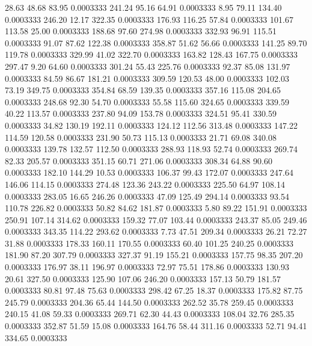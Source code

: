   28.63   48.68   83.95   0.0003333
 241.24   95.16   64.91   0.0003333
   8.95   79.11  134.40   0.0003333
 246.20   12.17  322.35   0.0003333
 176.93  116.25   57.84   0.0003333
 101.67  113.58   25.00   0.0003333
 188.68   97.60  274.98   0.0003333
 332.93   96.91  115.51   0.0003333
  91.07   87.62  122.38   0.0003333
 358.87   51.62   56.66   0.0003333
 141.25   89.70  119.78   0.0003333
 329.99   41.02  322.70   0.0003333
 163.82  128.43  167.75   0.0003333
 297.47    9.20   64.60   0.0003333
 301.24   55.43  225.76   0.0003333
  92.37   85.08  131.97   0.0003333
  84.59   86.67  181.21   0.0003333
 309.59  120.53   48.00   0.0003333
 102.03   73.19  349.75   0.0003333
 354.84   68.59  139.35   0.0003333
 357.16  115.08  204.65   0.0003333
 248.68   92.30   54.70   0.0003333
  55.58  115.60  324.65   0.0003333
 339.59   40.22  113.57   0.0003333
 237.80   94.09  153.78   0.0003333
 324.51   95.41  330.59   0.0003333
  34.82  130.19  192.11   0.0003333
 124.12  112.56  313.48   0.0003333
 147.22  114.59  120.58   0.0003333
 231.90   50.73  115.13   0.0003333
  21.71   69.08  340.08   0.0003333
 139.78  132.57  112.50   0.0003333
 288.93  118.93   52.74   0.0003333
 269.74   82.33  205.57   0.0003333
 351.15   60.71  271.06   0.0003333
 308.34   64.88   90.60   0.0003333
 182.10  144.29   10.53   0.0003333
 106.37   99.43  172.07   0.0003333
 247.64  146.06  114.15   0.0003333
 274.48  123.36  243.22   0.0003333
 225.50   64.97  108.14   0.0003333
 283.05   16.65  246.26   0.0003333
  47.09  125.49  294.14   0.0003333
  93.54  110.78  226.82   0.0003333
  50.82   84.62  181.87   0.0003333
   5.80   89.22  151.91   0.0003333
 250.91  107.14  314.62   0.0003333
 159.32   77.07  103.44   0.0003333
 243.37   85.05  249.46   0.0003333
 343.35  114.22  293.62   0.0003333
   7.73   47.51  209.34   0.0003333
  26.21   72.27   31.88   0.0003333
 178.33  160.11  170.55   0.0003333
  60.40  101.25  240.25   0.0003333
 181.90   87.20  307.79   0.0003333
 327.37   91.19  155.21   0.0003333
 157.75   98.35  207.20   0.0003333
 176.97   38.11  196.97   0.0003333
  72.97   75.51  178.86   0.0003333
 130.93   20.61  327.50   0.0003333
 125.90  107.06  246.20   0.0003333
 157.13   50.79  181.57   0.0003333
  80.81   97.48   75.63   0.0003333
 298.42   67.25   18.37   0.0003333
 175.82   87.75  245.79   0.0003333
 204.36   65.44  144.50   0.0003333
 262.52   35.78  259.45   0.0003333
 240.15   41.08   59.33   0.0003333
 269.71   62.30   44.43   0.0003333
 108.04   32.76  285.35   0.0003333
 352.87   51.59   15.08   0.0003333
 164.76   58.44  311.16   0.0003333
  52.71   94.41  334.65   0.0003333
